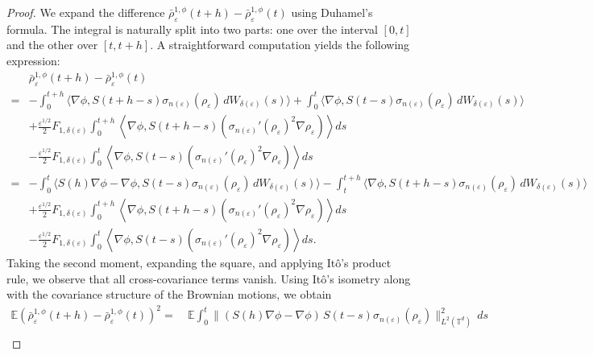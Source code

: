 \documentclass[10pt,a4paper]{amsart}
\begin{document}
\begin{proof}
We expand the difference $\bar{\rho}^{1,\phi}_{\varepsilon}(t+h) - \bar{\rho}^{1,\phi}_{\varepsilon}(t)$ using Duhamel's formula. The integral is naturally split into two parts: one over the interval $[0, t]$ and the other over $[t, t+h]$. A straightforward computation yields the following expression:
\begin{align*}
&\bar{\rho}^{1,\phi}_{\varepsilon}(t+h) - \bar{\rho}^{1,\phi}_{\varepsilon}(t)\\ 
=& - \int_0^{t+h} \Big\langle \nabla\phi, S(t+h - s) \sigma_{n(\varepsilon)}(\rho_{\varepsilon}) \, dW_{\delta(\varepsilon)}(s) \Big\rangle 
+ \int_0^t \Big\langle \nabla\phi, S(t - s) \sigma_{n(\varepsilon)}(\rho_{\varepsilon}) \, dW_{\delta(\varepsilon)}(s) \Big\rangle \\
& + \frac{\varepsilon^{1/2}}{2} F_{1,\delta(\varepsilon)} \int_0^{t+h} \left\langle \nabla\phi, S(t+h - s) \left( \sigma_{n(\varepsilon)}'(\rho_{\varepsilon})^2 \nabla \rho_{\varepsilon} \right) \right\rangle ds \\
& - \frac{\varepsilon^{1/2}}{2} F_{1,\delta(\varepsilon)} \int_0^t \left\langle \nabla\phi, S(t - s) \left( \sigma_{n(\varepsilon)}'(\rho_{\varepsilon})^2 \nabla \rho_{\varepsilon} \right) \right\rangle ds \\
=& - \int_0^t \Big\langle S(h)\nabla\phi - \nabla\phi, S(t - s) \sigma_{n(\varepsilon)}(\rho_{\varepsilon}) \, dW_{\delta(\varepsilon)}(s) \Big\rangle 
- \int_t^{t+h} \Big\langle \nabla\phi, S(t+h - s) \sigma_{n(\varepsilon)}(\rho_{\varepsilon}) \, dW_{\delta(\varepsilon)}(s) \Big\rangle \\
& + \frac{\varepsilon^{1/2}}{2} F_{1,\delta(\varepsilon)} \int_0^{t+h} \left\langle \nabla\phi, S(t+h - s) \left( \sigma_{n(\varepsilon)}'(\rho_{\varepsilon})^2 \nabla \rho_{\varepsilon} \right) \right\rangle ds \\
& - \frac{\varepsilon^{1/2}}{2} F_{1,\delta(\varepsilon)} \int_0^t \left\langle \nabla\phi, S(t - s) \left( \sigma_{n(\varepsilon)}'(\rho_{\varepsilon})^2 \nabla \rho_{\varepsilon} \right) \right\rangle ds.
\end{align*}
Taking the second moment, expanding the square, and applying It\^o's product rule, we observe that all cross-covariance terms vanish. Using It\^o's isometry along with the covariance structure of the Brownian motions, we obtain
\begin{align*}
\mathbb{E} \left( \bar{\rho}^{1,\phi}_{\varepsilon}(t+h) - \bar{\rho}^{1,\phi}_{\varepsilon}(t) \right)^2 
=&\ \mathbb{E} \int_0^t \| (S(h)\nabla\phi - \nabla\phi)\, S(t - s) \sigma_{n(\varepsilon)}(\rho_{\varepsilon}) \|_{L^2(\mathbb{T}^d)}^2\, ds \\

\end{align*}
\end{proof}
\end{document}
